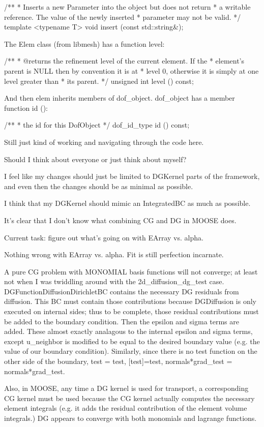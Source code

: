 {  /**
   * Inserts a new Parameter into the object but does not return
   * a writable reference.  The value of the newly inserted
   * parameter may not be valid.
   */
  template <typename T>
  void insert (const std::string&);

The Elem class (from libmesh) has a function level:

  /**
   * @returns the refinement level of the current element.  If the
   * element's parent is \p NULL then by convention it is at
   * level 0, otherwise it is simply at one level greater than
   * its parent.
   */
  unsigned int level () const;

And then elem inherits members of dof_object. dof_object has a member function id ():

  /**
   * \returns the \p id for this \p DofObject
   */
  dof_id_type id () const;

Still just kind of working and navigating through the code here.

Should I think about everyone or just think about myself?

I feel like my changes should just be limited to DGKernel parts of the framework, and even then the changes should be as minimal as possible.

I think that my DGKernel should mimic an IntegratedBC as much as possible.

It's clear that I don't know what combining CG and DG in MOOSE does.

Current task: figure out what's going on with EArray vs. alpha.

Nothing wrong with EArray vs. alpha. Fit is still perfection incarnate.

A pure CG problem with MONOMIAL basis functions will not converge; at least not when I was twiddling around with the 2d_diffusion_dg_test case. DGFunctionDiffusionDirichletBC contains the necessary DG residuals from diffusion. This BC must contain those contributions because DGDiffusion is only executed on internal sides; thus to be complete, those residual contributions must be added to the boundary condition. Then the epsilon and sigma terms are added. These almost exactly analagous to the internal epsilon and sigma terms, except u_neighbor is modified to be equal to the desired boundary value (e.g. the value of our boundary condition). Similarly, since there is no test function on the other side of the boundary, {test} = test, [test]=test, {normals*grad_test} = normals*grad_test.

Also, in MOOSE, any time a DG kernel is used for transport, a corresponding CG kernel must be used because the CG kernel actually computes the necessary element integrals (e.g. it adds the residual contribution of the element volume integrals.) DG appears to converge with both monomials and lagrange functions.

}

